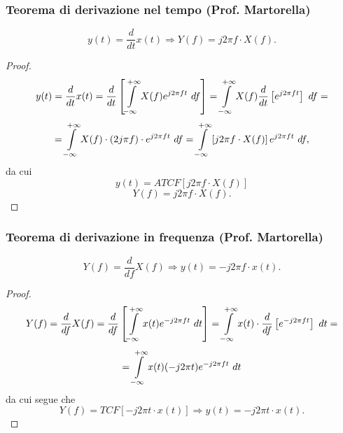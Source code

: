 \documentclass[12pt,oneside,openany]{memoir}
\numberwithin{equation}{subsection}
\newcommand{\dt}{\ dt}
\newcommand{\df}{\ df}
\begin{document}

\subsubsection{Teorema di derivazione nel tempo (Prof. Martorella)}
\[
    y(t) = \frac{d}{dt} x(t) \Longrightarrow Y(f) = j 2 \pi f \cdot X(f).
\]
\begin{proof}
\[
    y(t) = \frac{d}{dt} x(t) = \frac{d}{dt} \left[
        \int\displaylimits_{-\infty}^{+\infty} X(f) e^{j 2 \pi f t} \df
    \right] = \int\displaylimits_{-\infty}^{+\infty} X(f) \frac{d}{dt}
    \left[e^{j 2 \pi f t}\right] \df =
\]
\[
    = \int\displaylimits_{-\infty}^{+\infty} X(f) \cdot (2 j \pi f) \cdot
    e^{j 2 \pi f t} \df = \int\displaylimits_{-\infty}^{+\infty}
    \left[j 2 \pi f \cdot X(f)\right] e^{j 2 \pi f t} \df,
\]
da cui
\[
    y(t) = ATCF\left[j 2 \pi f \cdot X(f)\right]
\]
\[
    Y(f) = j 2 \pi f \cdot X(f).
\]
\end{proof}


\subsubsection{Teorema di derivazione in frequenza (Prof. Martorella)}
\[
    Y(f) = \frac{d}{df} X(f) \Longrightarrow y(t) = -j 2 \pi f \cdot x(t).
\]
\begin{proof}
\[
    Y(f) = \frac{d}{df} X(f) = \frac{d}{df} \left[
        \int\displaylimits_{-\infty}^{+\infty} x(t) e^{-j 2 \pi f t} \dt
    \right] = \int\displaylimits_{-\infty}^{+\infty} x(t) \cdot \frac{d}{df}
    \left[e^{-j 2 \pi f t}\right] \dt =
\]
\[
    = \int\displaylimits_{-\infty}^{+\infty} x(t) (-j 2 \pi t) e^{-j 2 \pi f t}
    \dt
\]
da cui segue che
\[
    Y(f) = TCF\left[-j 2 \pi t \cdot x(t)\right] \Longrightarrow y(t) = -j 2
    \pi t \cdot x(t).
\]
\end{proof}

\end{document}
